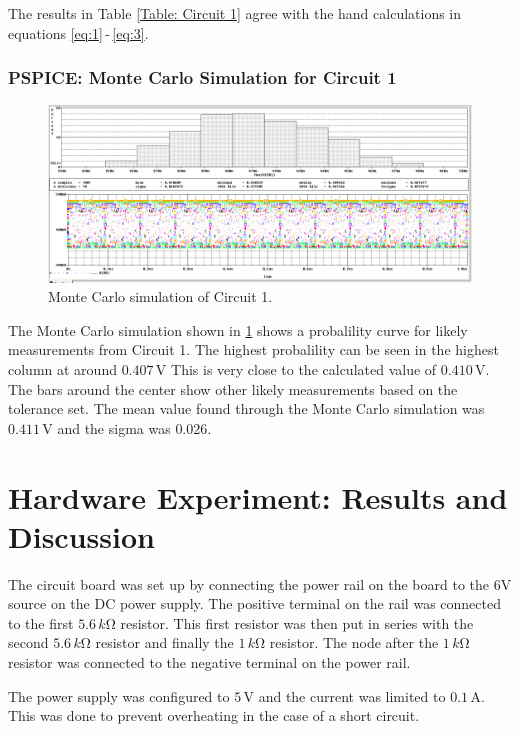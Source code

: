 \documentclass[11pt]{article}
\begin{document}
The results in Table \ref{Table: Circuit 1} agree with the hand calculations in equations \ref{eq:1}\,-\,\ref{eq:3}.

\subsubsection{PSPICE: Monte Carlo Simulation for Circuit 1}

\begin{figure}[htbp]
	\centering
	\includegraphics[width=\textwidth]{simulation}
	\caption{Monte Carlo simulation of Circuit 1.}
	\label{Fig:Circuit1MonteCarlo}
\end{figure}

The Monte Carlo simulation shown in \ref{Fig:Circuit1MonteCarlo} shows a probalility curve for likely measurements from Circuit 1. The highest probalility can be seen in the highest column at around $0.407\,\si\volt$ This is very close to the calculated value of $0.410\,\si\volt$. The bars around the center show other likely measurements based on the tolerance set. The mean value found through the Monte Carlo simulation was $0.411\,\si\volt$ and the sigma was $0.026$. 

\section{Hardware Experiment: Results and Discussion}
The circuit board was set up by connecting the power rail on the board to the 6V source on the DC power supply. The positive terminal on the rail was connected to the first $5.6\,k\si\ohm$ resistor. This first resistor was then put in series with the second $5.6\,k\si\ohm$ resistor and finally the $1\,k\si\ohm$ resistor. The node after the $1\,k\si\ohm$ resistor was connected to the negative terminal on the power rail. \par

The power supply was configured to $5\,\si\volt$ and the current was limited to $0.1\,\si\ampere$. This was done to prevent overheating in the case of a short circuit.
\end{document}
